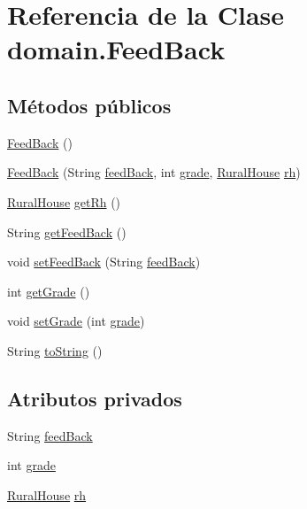 \hypertarget{classdomain_1_1_feed_back}{}\section{Referencia de la Clase domain.\+Feed\+Back}
\label{classdomain_1_1_feed_back}
\subsection*{Métodos públicos}
\begin{DoxyCompactItemize}
\item 
\mbox{\hyperlink{classdomain_1_1_feed_back_a35a311801c50115ea7fc9685581900b9}{Feed\+Back}} ()
\item 
\mbox{\hyperlink{classdomain_1_1_feed_back_af677d71a2a42fa66f07889b4e7ace5b3}{Feed\+Back}} (String \mbox{\hyperlink{classdomain_1_1_feed_back_a0d97f3135463e892caddccf3f78f91bf}{feed\+Back}}, int \mbox{\hyperlink{classdomain_1_1_feed_back_a979ed82b8bc6c40e8447a88f84321751}{grade}}, \mbox{\hyperlink{classdomain_1_1_rural_house}{Rural\+House}} \mbox{\hyperlink{classdomain_1_1_feed_back_a4ec8b55bbf07e1a8e5bd00c0a27e13a3}{rh}})
\item 
\mbox{\hyperlink{classdomain_1_1_rural_house}{Rural\+House}} \mbox{\hyperlink{classdomain_1_1_feed_back_a0298aaa47399d95b96c64b4e1dfa872d}{get\+Rh}} ()
\item 
String \mbox{\hyperlink{classdomain_1_1_feed_back_a960c0c38e2c9c79790cc33ed6b9ba769}{get\+Feed\+Back}} ()
\item 
void \mbox{\hyperlink{classdomain_1_1_feed_back_a0977dab584089e45f38e9a0bd459432d}{set\+Feed\+Back}} (String \mbox{\hyperlink{classdomain_1_1_feed_back_a0d97f3135463e892caddccf3f78f91bf}{feed\+Back}})
\item 
int \mbox{\hyperlink{classdomain_1_1_feed_back_af85865ec0c8e4dca3f11878326565bfa}{get\+Grade}} ()
\item 
void \mbox{\hyperlink{classdomain_1_1_feed_back_a3b55e08e1969d6f2046bff3b8b1cd4b5}{set\+Grade}} (int \mbox{\hyperlink{classdomain_1_1_feed_back_a979ed82b8bc6c40e8447a88f84321751}{grade}})
\item 
String \mbox{\hyperlink{classdomain_1_1_feed_back_a2a641d462289be5d0c53c6fcdabc8052}{to\+String}} ()
\end{DoxyCompactItemize}
\subsection*{Atributos privados}
\begin{DoxyCompactItemize}
\item 
String \mbox{\hyperlink{classdomain_1_1_feed_back_a0d97f3135463e892caddccf3f78f91bf}{feed\+Back}}
\item 
int \mbox{\hyperlink{classdomain_1_1_feed_back_a979ed82b8bc6c40e8447a88f84321751}{grade}}
\item 
\mbox{\hyperlink{classdomain_1_1_rural_house}{Rural\+House}} \mbox{\hyperlink{classdomain_1_1_feed_back_a4ec8b55bbf07e1a8e5bd00c0a27e13a3}{rh}}
\end{DoxyCompactItemize}


